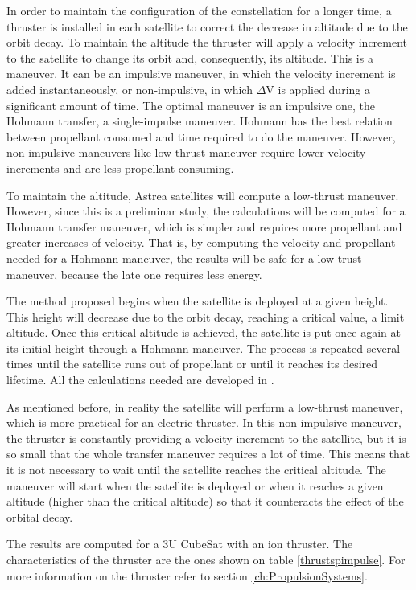 In order to maintain the configuration of the constellation for a longer time, a thruster is installed in each satellite to correct the decrease in altitude due to the orbit decay. To maintain the altitude the thruster will apply a velocity increment to the satellite to change its orbit and, consequently, its altitude. This is a maneuver. It can be an impulsive maneuver, in which the velocity increment is added instantaneously, or non-impulsive, in which $\Delta$V is applied during a significant amount of time. The optimal maneuver is an impulsive one, the Hohmann transfer, a single-impulse maneuver. Hohmann has the best relation between propellant consumed and time required to do the maneuver. However, non-impulsive maneuvers like low-thrust maneuver require lower velocity increments and are less propellant-consuming.

To maintain the altitude, Astrea satellites will compute a low-thrust maneuver. However, since this is a preliminar study, the calculations will be computed for a Hohmann transfer maneuver, which is simpler and requires more propellant and greater increases of velocity. That is, by computing the velocity and propellant needed for a Hohmann maneuver, the results will be safe for a low-trust maneuver, because the late one requires less energy.

The method proposed begins when the satellite is deployed at a given height. This height will decrease due to the orbit decay, reaching a critical value, a limit altitude. Once this critical altitude is achieved, the satellite is put once again at its initial height through a Hohmann maneuver. The process is repeated several times until the satellite runs out of propellant or until it reaches its desired lifetime. All the calculations needed are developed in \cite[Chapter 4, Section 3]{annex1}.

As mentioned before, in reality the satellite will perform a low-thrust maneuver, which is more practical for an electric thruster. In this non-impulsive maneuver, the thruster is constantly providing a velocity increment to the satellite, but it is so small that the whole transfer maneuver requires a lot of time. This means that it is not necessary to wait until the satellite reaches the critical altitude. The maneuver will start when the satellite is deployed or when it reaches a given altitude (higher than the critical altitude) so that it counteracts the effect of the orbital decay.

The results are computed for a 3U CubeSat with an ion thruster. The characteristics of the thruster are the ones shown on table \ref{thrustspimpulse}. For more information on the thruster refer to section \ref{ch:PropulsionSystems}.

